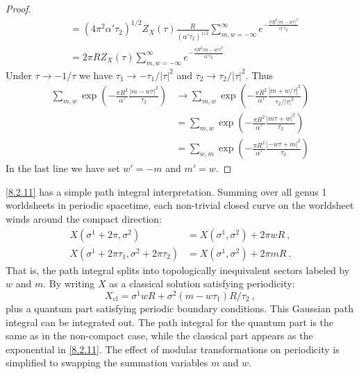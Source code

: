 \begin{tcolorbox}[breakable]
\begin{proof}
\begin{align*}
		&= (4\pi^2 \alpha' \tau_2)^{1/2} Z_X(\tau) \frac{R}{(\alpha' \tau_2)^{1/2}} \sum_{m,w=-\infty}^{\infty} e^{-\frac{\pi R^2 |m-w \tau|^2}{\alpha' \tau_2}} \\
		&= 2\pi R Z_X(\tau) \sum_{m,w=-\infty}^{\infty} e^{-\frac{\pi R^2 |m-w \tau|^2}{\alpha' \tau_2}} 
	\end{align*}	
	Under \( \tau \to -1/\tau \) we have \( \tau_1 \to -\tau_1/|\tau|^2 \) and \( \tau_2 \to \tau_2/|\tau|^2 \). Thus
	\begin{align*}
		\sum_{m,w} \exp\left(-\frac{\pi R^2}{\alpha'} \frac{|m-w\tau|^2}{\tau_2}\right) 
		&\to \sum_{m,w} \exp\left(-\frac{\pi R^2}{\alpha'} \frac{|m+w/\tau|^2}{\tau_2/|\tau|^2}\right) \\
		&= \sum_{m,w} \exp\left(-\frac{\pi R^2}{\alpha'} \frac{|m\tau+w|^2}{\tau_2}\right) \\
		&= \sum_{w,m} \exp\left(-\frac{\pi R^2}{\alpha'} \frac{|-w\tau+m|^2}{\tau_2}\right)
	\end{align*}
	In the last line we have set \( w' = -m \) and \( m' = w \).
	\end{proof}
\end{tcolorbox}

\eqref{8.2.11} has a simple path integral interpretation.
Summing over all genus 1 worldsheets in periodic spacetime, each non-trivial closed curve on the worldsheet winds around the compact direction:
\begin{subequations} \label{8.2.12}
	\begin{align}
		X(\sigma^{1}+2 \pi, \sigma^{2}) &= X(\sigma^{1}, \sigma^{2})+2 \pi w R \:, \label{8.2.12a} \\
		X(\sigma^{1}+2 \pi \tau_{1}, \sigma^{2}+2 \pi \tau_{2}) &= X(\sigma^{1}, \sigma^{2})+2 \pi m R \:. \label{8.2.12b} 
	\end{align}
\end{subequations}
That is, the path integral splits into topologically inequivalent sectors labeled by $w$ and $m$. By writing $X$ as a classical solution satisfying periodicity:
\begin{equation}
	X_{\mathrm{cl}}=\sigma^{1} w R+\sigma^{2}(m-w \tau_{1}) R / \tau_{2} \:, \label{8.2.13}
\end{equation}
plus a quantum part satisfying periodic boundary conditions.
This Gaussian path integral can be integrated out. The path integral for the quantum part is the same as in the non-compact case, while the classical part appears as the exponential in \eqref{8.2.11}. The effect of modular transformations on periodicity is simplified to swapping the summation variables $m$ and $w$.

